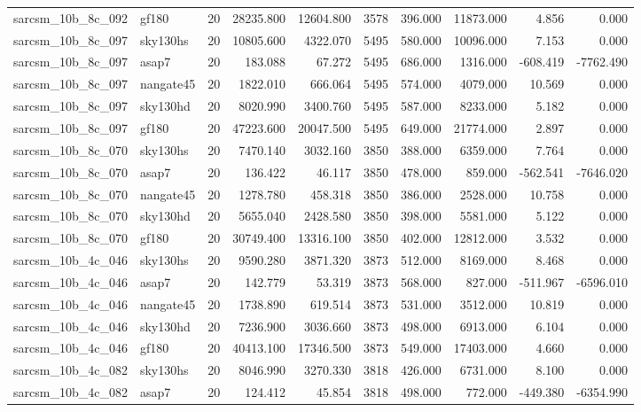 \begin{tabular}{llrrrrrrrr}
sarcsm\_10b\_8c\_092 & gf180 & 20 & 28235.800 & 12604.800 & 3578 & 396.000 & 11873.000 & 4.856 & 0.000 \\
sarcsm\_10b\_8c\_097 & sky130hs & 20 & 10805.600 & 4322.070 & 5495 & 580.000 & 10096.000 & 7.153 & 0.000 \\
sarcsm\_10b\_8c\_097 & asap7 & 20 & 183.088 & 67.272 & 5495 & 686.000 & 1316.000 & -608.419 & -7762.490 \\
sarcsm\_10b\_8c\_097 & nangate45 & 20 & 1822.010 & 666.064 & 5495 & 574.000 & 4079.000 & 10.569 & 0.000 \\
sarcsm\_10b\_8c\_097 & sky130hd & 20 & 8020.990 & 3400.760 & 5495 & 587.000 & 8233.000 & 5.182 & 0.000 \\
sarcsm\_10b\_8c\_097 & gf180 & 20 & 47223.600 & 20047.500 & 5495 & 649.000 & 21774.000 & 2.897 & 0.000 \\
sarcsm\_10b\_8c\_070 & sky130hs & 20 & 7470.140 & 3032.160 & 3850 & 388.000 & 6359.000 & 7.764 & 0.000 \\
sarcsm\_10b\_8c\_070 & asap7 & 20 & 136.422 & 46.117 & 3850 & 478.000 & 859.000 & -562.541 & -7646.020 \\
sarcsm\_10b\_8c\_070 & nangate45 & 20 & 1278.780 & 458.318 & 3850 & 386.000 & 2528.000 & 10.758 & 0.000 \\
sarcsm\_10b\_8c\_070 & sky130hd & 20 & 5655.040 & 2428.580 & 3850 & 398.000 & 5581.000 & 5.122 & 0.000 \\
sarcsm\_10b\_8c\_070 & gf180 & 20 & 30749.400 & 13316.100 & 3850 & 402.000 & 12812.000 & 3.532 & 0.000 \\
sarcsm\_10b\_4c\_046 & sky130hs & 20 & 9590.280 & 3871.320 & 3873 & 512.000 & 8169.000 & 8.468 & 0.000 \\
sarcsm\_10b\_4c\_046 & asap7 & 20 & 142.779 & 53.319 & 3873 & 568.000 & 827.000 & -511.967 & -6596.010 \\
sarcsm\_10b\_4c\_046 & nangate45 & 20 & 1738.890 & 619.514 & 3873 & 531.000 & 3512.000 & 10.819 & 0.000 \\
sarcsm\_10b\_4c\_046 & sky130hd & 20 & 7236.900 & 3036.660 & 3873 & 498.000 & 6913.000 & 6.104 & 0.000 \\
sarcsm\_10b\_4c\_046 & gf180 & 20 & 40413.100 & 17346.500 & 3873 & 549.000 & 17403.000 & 4.660 & 0.000 \\
sarcsm\_10b\_4c\_082 & sky130hs & 20 & 8046.990 & 3270.330 & 3818 & 426.000 & 6731.000 & 8.100 & 0.000 \\
sarcsm\_10b\_4c\_082 & asap7 & 20 & 124.412 & 45.854 & 3818 & 498.000 & 772.000 & -449.380 & -6354.990 \\

\end{tabular}
